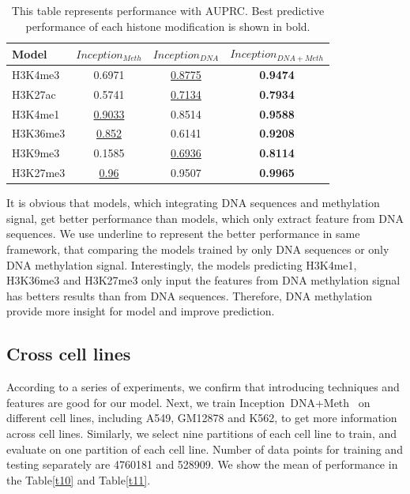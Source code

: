 \begin{table}[H]%
    \centering
    \begin{tabular}{lccc}
    \hline
    Model & $Inception_{Meth}$ & $Inception_{DNA}$ & $Inception_{DNA+Meth}$ \\\hline
    H3K4me3 & 0.6971 & \underline{0.8775} & \textbf{0.9474} \\
    H3K27ac & 0.5741 & \underline{0.7134} & \textbf{0.7934} \\
    H3K4me1 & \underline{0.9033} & 0.8514 & \textbf{0.9588} \\
    H3K36me3 & \underline{0.852} & 0.6141 & \textbf{0.9208} \\
    H3K9me3 & 0.1585 & \underline{0.6936} & \textbf{0.8114} \\
    H3K27me3 & \underline{0.96} & 0.9507 & \textbf{0.9965} \\\hline
    \end{tabular}
    \captionsetup{labelfont=bf}
    \renewcommand{\baselinestretch}{1.0}
    \caption[Comparison of different inputs of inception with AUPRC]{This table represents performance with AUPRC. Best predictive performance of each histone modification is shown in bold.}
    \label{t9}
\end{table}

It is obvious that models, which integrating DNA sequences and methylation signal, get better performance than models, which only extract feature from DNA sequences. We use underline to represent the better performance in same framework, that comparing the models trained by only DNA sequences or only DNA methylation signal. Interestingly, the models predicting H3K4me1, H3K36me3 and H3K27me3 only input the features from DNA methylation signal has betters results than from DNA sequences. Therefore, DNA methylation provide more insight for model and improve prediction.

\subsection{Cross cell lines} \label{cross}
According to a series of experiments, we confirm that introducing techniques and features are good for our model. Next, we train Inception~DNA+Meth~ on  different cell lines, including A549, GM12878 and K562, to get more information across cell lines. Similarly, we select nine partitions of each cell line to train, and evaluate on one partition of each cell line. Number of data points for training and testing separately are 4760181 and 528909. We show the mean of performance in the Table\ref{t10} and Table\ref{t11}.

